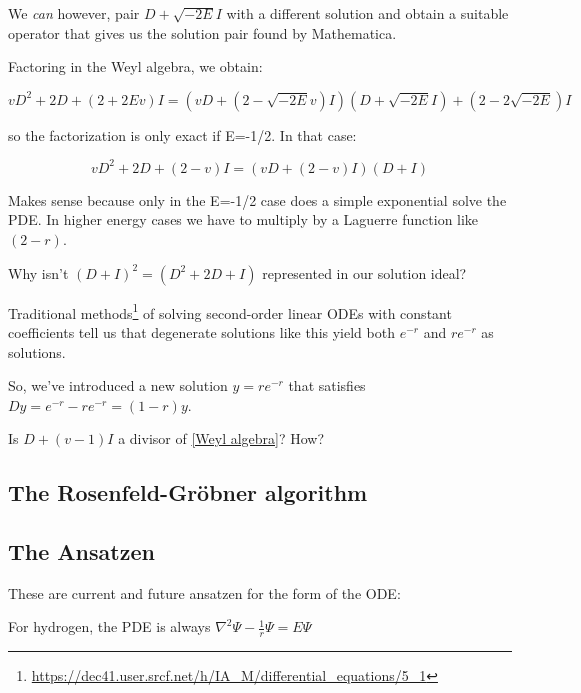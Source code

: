 \documentclass{article}
\begin{document}
We {\it can} however, pair $D+\sqrt{-2E}I$ with a different solution and obtain a suitable operator
that gives us the solution pair found by Mathematica.

Factoring in the Weyl algebra, we obtain:

\begin{equation}
vD^2 + 2D + (2+2Ev) I = (vD + (2-\sqrt{-2E}v)I) (D+\sqrt{-2E}I) + (2-2\sqrt{-2E})I
\end{equation}

so the factorization is only exact if E=-1/2.  In that case:

\begin{equation}
\label{Weyl algebra}
vD^2 + 2D + (2-v) I = (vD + (2-v)I) (D+I)
\end{equation}

Makes sense because only in the E=-1/2 case does a simple exponential solve the PDE.  In
higher energy cases we have to multiply by a Laguerre function like $(2-r)$.

Why isn't $(D+I)^2 = (D^2+2D+I)$ represented in our solution ideal?

Traditional methods\footnote{\url{https://dec41.user.srcf.net/h/IA_M/differential_equations/5_1}}
of solving second-order linear ODEs with constant coefficients tell us that degenerate
solutions like this yield both $e^{-r}$ and $re^{-r}$ as solutions.

So, we've introduced a new solution $y=re^{-r}$ that satisfies $Dy=e^{-r}-re^{-r}=(1-r)y$.

Is $D+(v-1)I$ a divisor of \eqref{Weyl algebra}?  How?

\subsection*{The Rosenfeld-Gr\"obner algorithm}

\subsection*{The Ansatzen}

These are current and future ansatzen for the form of the ODE:

For hydrogen, the PDE is always $\nabla^2 \Psi - \frac{1}{r} \Psi = E \Psi$
\end{document}
